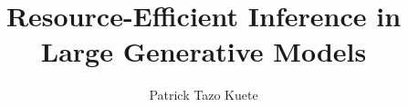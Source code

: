 

\def\titlefontStandardSerif{} 





\author{Patrick Tazo Kuete}
\title{Resource-Efficient Inference in Large Generative Models}
\def\titlelineB{Resource-Efficient}
\def\titlelineC{Inference in}
\def\titlelineD{Large Generative Models}
\def\thesistype{Seminar}
\def\thesistypegerman{Seminararbeit} %
\def\fieldofstudy{Electrical Engineering, Information Technology and Computer Engineering}
\def\supervisor{Hazem el Hadj Khalifa, M.Sc.} %


\makeatletter
\hypersetup{pdftitle = \@title}
\hypersetup{pdfauthor = \@author}
\makeatother
\hypersetup{pdfsubject = \thesistype}

